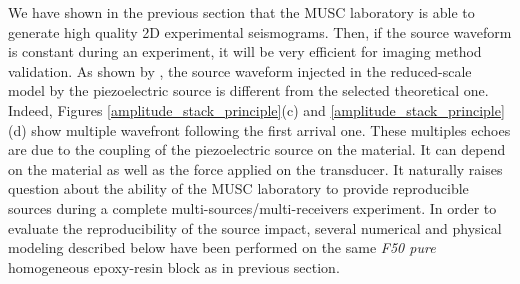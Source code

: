 \documentclass[manuscript,revised]{geophysics}
\begin{document}
\noindent We have shown in the previous section that the MUSC laboratory is able to generate high quality 2D experimental seismograms. Then, if the source waveform is constant during an experiment, it will be very efficient for imaging method validation. As shown by \citet{Bretaudeau_SSM_2011}, the source waveform injected in the reduced-scale model by the piezoelectric source is different from the selected theoretical one. Indeed, Figures \ref{amplitude_stack_principle}(c) and \ref{amplitude_stack_principle}(d) show multiple wavefront following the first arrival one. These multiples echoes are due to the coupling of the piezoelectric source on the material. It can depend on the material as well as the force applied on the transducer. It naturally raises question about the ability of the MUSC laboratory to provide reproducible sources during a complete multi-sources/multi-receivers experiment. In order to evaluate the reproducibility of the source impact, several numerical and physical modeling described below have been performed on the same \textit{F50 pure} homogeneous epoxy-resin block as in previous section.
\end{document}
